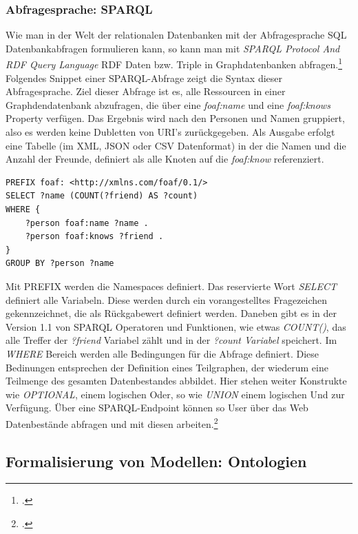 \documentclass[12pt,a4paper]{article}
\begin{document}
\subsubsection{Abfragesprache: SPARQL}
Wie man in der Welt der relationalen Datenbanken mit der Abfragesprache SQL Datenbankabfragen formulieren kann, so kann man mit \textit{SPARQL Protocol And RDF Query Language} RDF Daten bzw. Triple in Graphdatenbanken abfragen.\footcite[][]{w3c2013sparql}
\\
Folgendes Snippet einer SPARQL-Abfrage zeigt die Syntax dieser Abfragesprache. Ziel dieser Abfrage ist es, alle Ressourcen in einer Graphdendatenbank abzufragen, die über eine \textit{foaf:name} und eine \textit{foaf:knows} Property verfügen. Das Ergebnis wird nach den Personen und Namen gruppiert, also es werden keine Dubletten von URI's zurückgegeben. Als Ausgabe erfolgt eine Tabelle (im XML, JSON oder CSV Datenformat) in der die Namen und die Anzahl der Freunde, definiert als alle Knoten auf die \textit{foaf:know} referenziert.
\begin{lstlisting}[]
PREFIX foaf: <http://xmlns.com/foaf/0.1/>
SELECT ?name (COUNT(?friend) AS ?count)
WHERE { 
    ?person foaf:name ?name . 
    ?person foaf:knows ?friend . 
} 
GROUP BY ?person ?name
\end{lstlisting}
Mit PREFIX werden die Namespaces definiert. Das reservierte Wort \textit{SELECT} definiert alle Variabeln. Diese werden durch ein vorangestelltes Fragezeichen gekennzeichnet, die als Rückgabewert definiert werden. Daneben gibt es in der Version 1.1 von SPARQL Operatoren und Funktionen, wie etwas \textit{COUNT()}, das alle Treffer der \textit{?friend} Variabel zählt und in der \textit{?count Variabel} speichert. Im \textit{WHERE} Bereich werden alle Bedingungen für die Abfrage definiert. Diese Bedinungen entsprechen der Definition eines Teilgraphen, der wiederum eine Teilmenge des gesamten Datenbestandes abbildet. Hier stehen weiter Konstrukte wie \textit{OPTIONAL}, einem logischen Oder, so wie \textit{UNION} einem logischen Und zur Verfügung. Über eine SPARQL-Endpoint können so User über das Web Datenbestände abfragen und mit diesen arbeiten.\footcite[][S.1-45]{ducharme2013learning}


\subsection{Formalisierung von Modellen: Ontologien}
\label{Ontologie}
\end{document}
